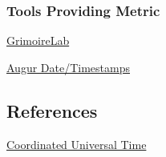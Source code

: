 \hypertarget{tools-providing-metric}{%
\subsubsection{Tools Providing Metric}\label{tools-providing-metric}}

\href{https://chaoss.github.io/grimoirelab/}{GrimoireLab}

\href{https://docs.augur.net/\#dates-timestamps}{Augur Date/Timestamps}

\hypertarget{references}{%
\subsection{References}\label{references}}

\href{https://en.wikipedia.org/wiki/Coordinated_Universal_Time}{Coordinated
Universal Time}
